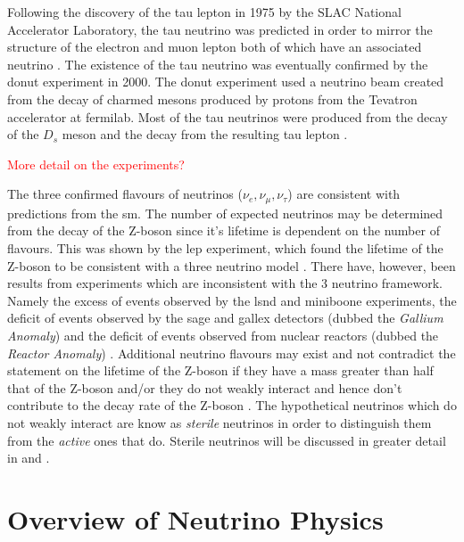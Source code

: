 Following the discovery of the tau lepton in 1975 by the SLAC National Accelerator Laboratory, the tau neutrino was predicted in order to mirror the structure of the electron and muon lepton both of which have an associated neutrino \cite{tau_lepton_discovery}. The existence of the tau neutrino was eventually confirmed by the \Gls{donut} experiment in 2000. The \Gls{donut} experiment used a neutrino beam created from the decay of charmed mesons produced by protons from the  Tevatron accelerator at \gls{fermilab}. Most of the tau neutrinos were produced from the decay of the $D_s$ meson and the decay from the resulting tau lepton \cite{DONUT}.

\textcolor{red}{More detail on the experiments?}

The three confirmed flavours of neutrinos ($\nu_e, \nu_{\mu}, \nu_{\tau}$) are consistent with predictions from the \Gls{sm}. The number of expected neutrinos may be determined from the decay of the Z-boson since it's lifetime is dependent on the number of flavours. This was shown by the \gls{lep} experiment, which found the lifetime of the Z-boson to be consistent with a three neutrino model \cite{Zboson_number_of_neutrinos}\cite{LEP}. There have, however, been results from experiments which are inconsistent with the 3 neutrino framework. Namely the excess of events observed by the \gls{lsnd} and \gls{miniboone} experiments, the deficit of events observed by the \gls{sage} and \gls{gallex} detectors (dubbed the \textit{Gallium Anomaly}) and the deficit of events observed from nuclear reactors (dubbed the \textit{Reactor Anomaly}) \cite{LSND_excess} \cite{MiniBooNE_excess} \cite{GALLEX} \cite{Gallex_reanalysis} \cite{SAGE} \cite{Reactor_anomaly}. Additional neutrino flavours may exist and not contradict the statement on the lifetime of the Z-boson if they have a mass greater than half that of the Z-boson and/or they do not weakly interact and hence don't contribute to the decay rate of the Z-boson \cite{Zboson_number_of_neutrinos}. The hypothetical neutrinos which do not weakly interact are know as \textit{sterile} neutrinos in order to distinguish them from the \textit{active} ones that do. Sterile neutrinos will be discussed in greater detail in  and .

\section{Overview of Neutrino Physics}

